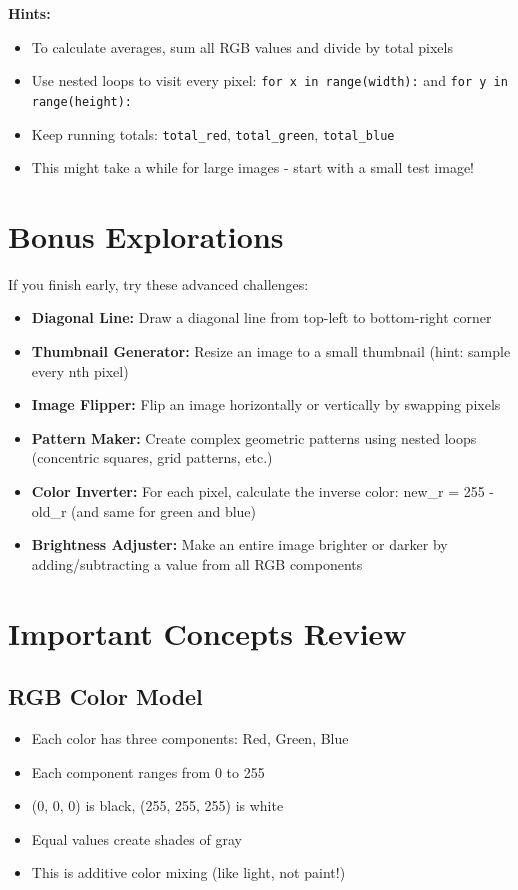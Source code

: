 \documentclass[11pt]{article}
\begin{document}
\textbf{Hints:}
\begin{itemize}
    \item To calculate averages, sum all RGB values and divide by total pixels
    \item Use nested loops to visit every pixel: \texttt{for x in range(width):} and \texttt{for y in range(height):}
    \item Keep running totals: \texttt{total\_red}, \texttt{total\_green}, \texttt{total\_blue}
    \item This might take a while for large images - start with a small test image!
\end{itemize}

\section*{Bonus Explorations}

If you finish early, try these advanced challenges:

\begin{itemize}
    \item \textbf{Diagonal Line:} Draw a diagonal line from top-left to bottom-right corner
    \item \textbf{Thumbnail Generator:} Resize an image to a small thumbnail (hint: sample every nth pixel)
    \item \textbf{Image Flipper:} Flip an image horizontally or vertically by swapping pixels
    \item \textbf{Pattern Maker:} Create complex geometric patterns using nested loops (concentric squares, grid patterns, etc.)
    \item \textbf{Color Inverter:} For each pixel, calculate the inverse color: new\_r = 255 - old\_r (and same for green and blue)
    \item \textbf{Brightness Adjuster:} Make an entire image brighter or darker by adding/subtracting a value from all RGB components
\end{itemize}

\section*{Important Concepts Review}

\subsection*{RGB Color Model}
\begin{itemize}
    \item Each color has three components: Red, Green, Blue
    \item Each component ranges from 0 to 255
    \item (0, 0, 0) is black, (255, 255, 255) is white
    \item Equal values create shades of gray
    \item This is additive color mixing (like light, not paint!)
\end{itemize}
\end{document}
